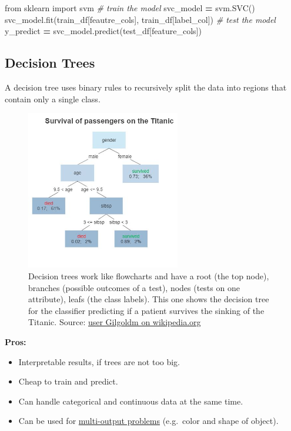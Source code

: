 \documentclass[
]{book}
\newenvironment{Shaded}{\begin{snugshade}}{\end{snugshade}}
\newcommand{\CommentTok}[1]{\textcolor[rgb]{0.56,0.35,0.01}{\textit{#1}}}
\newcommand{\ImportTok}[1]{#1}
\newcommand{\NormalTok}[1]{#1}
\newcommand{\OperatorTok}[1]{\textcolor[rgb]{0.81,0.36,0.00}{\textbf{#1}}}
\begin{document}
\begin{Shaded}
\begin{Highlighting}[]
\ImportTok{from}\NormalTok{ sklearn }\ImportTok{import}\NormalTok{ svm}
\CommentTok{\# train the model}
\NormalTok{svc\_model }\OperatorTok{=}\NormalTok{ svm.SVC()}
\NormalTok{svc\_model.fit(train\_df[feautre\_cols], train\_df[label\_col])}
\CommentTok{\# test the model}
\NormalTok{y\_predict }\OperatorTok{=}\NormalTok{ svc\_model.predict(test\_df[feature\_cols])}
\end{Highlighting}
\end{Shaded}

\hypertarget{decision-trees}{%
\subsection{Decision Trees}\label{decision-trees}}

A decision tree uses binary rules to recursively split the data into
regions that contain only a single class.

\begin{figure}
\centering
\includegraphics[width=0.6\textwidth,height=\textheight]{figures/Decision_Tree.jpg}
\caption{Decision trees work like flowcharts and have a root (the top node),
branches (possible outcomes of a test), nodes (tests on one attribute),
leafs (the class labels). This one shows the decision tree for the
classifier predicting if a patient survives the sinking of the Titanic.
Source: \href{https://commons.wikimedia.org/wiki/File:Decision_Tree.jpg}{user Gilgoldm on
wikipedia.org}}
\end{figure}

\textbf{Pros:}

\begin{itemize}
\item
  Interpretable results, if trees are not too big.
\item
  Cheap to train and predict.
\item
  Can handle categorical and continuous data at the same time.
\item
  Can be used for \href{https://scikit-learn.org/stable/modules/tree.html\#multi-output-problems}{multi-output
  problems}
  (e.g.~color and shape of object).
\end{itemize}
\end{document}
